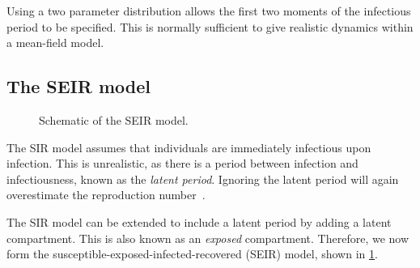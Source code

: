 \documentclass[thesis.tex]{subfiles}
\begin{document}
Using a two parameter distribution allows the first two moments of the infectious period to be specified.
This is normally sufficient to give realistic dynamics within a mean-field model.

\subsection{The SEIR model}
\begin{figure}[h]
  \caption[The SEIR model]{Schematic of the SEIR model.}
  \label{SEIR:fig:SEIR}
\end{figure}

The SIR model assumes that individuals are immediately infectious upon infection.
This is unrealistic, as there is a period between infection and infectiousness, known as the \emph{latent period}.
Ignoring the latent period will again overestimate the reproduction number~\autocite{wearingAppropriate}.

The SIR model can be extended to include a latent period by adding a latent compartment.
This is also known as an \emph{exposed} compartment.
Therefore, we now form the susceptible-exposed-infected-recovered (SEIR) model, shown in \cref{SEIR:fig:SEIR}.
\end{document}
